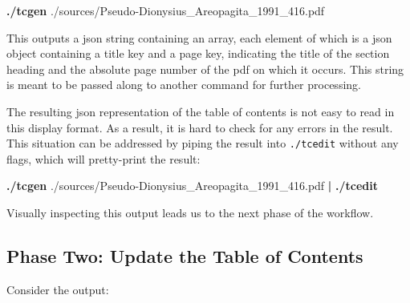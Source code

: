 \documentclass[
  letterpaper,
]{tufte-handout}
\newenvironment{Shaded}{\begin{snugshade}}{\end{snugshade}}
\newcommand{\ExtensionTok}[1]{\textcolor[rgb]{0.00,0.58,1.00}{\textbf{#1}}}
\newcommand{\KeywordTok}[1]{\textcolor[rgb]{0.12,0.11,0.11}{\textbf{#1}}}
\newcommand{\NormalTok}[1]{\textcolor[rgb]{0.12,0.11,0.11}{#1}}
\begin{document}
\begin{Shaded}
\begin{Highlighting}[]
\ExtensionTok{./tcgen}\NormalTok{ ./sources/Pseudo{-}Dionysius\_Areopagita\_1991\_416.pdf}
\end{Highlighting}
\end{Shaded}

This outputs a json string containing an array, each element of which is
a json object containing a title key and a page key, indicating the
title of the section heading and the absolute page number of the pdf on
which it occurs. This string is meant to be passed along to another
command for further processing.

The resulting json representation of the table of contents is not easy
to read in this display format. As a result, it is hard to check for any
errors in the result. This situation can be addressed by piping the
result into \texttt{./tcedit} without any flags, which will pretty-print
the result:

\begin{Shaded}
\begin{Highlighting}[]
\ExtensionTok{./tcgen}\NormalTok{ ./sources/Pseudo{-}Dionysius\_Areopagita\_1991\_416.pdf }\KeywordTok{|} \ExtensionTok{./tcedit}
\end{Highlighting}
\end{Shaded}

Visually inspecting this output leads us to the next phase of the
workflow.

\subsection{Phase Two: Update the Table of
Contents}\label{phase-two-update-the-table-of-contents}

Consider the output:
\end{document}

